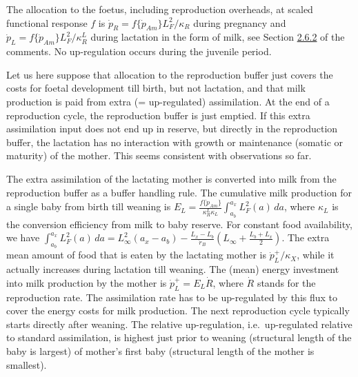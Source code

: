 The allocation to the foetus, including reproduction overheads, at scaled functional response $f$ is $\dot{p}_R = f \{\dot{p}_{Am}\} L_F^2/ \kappa_R$ during pregnancy and $\dot{p}_L = f \{\dot{p}_{Am}\} L_F^2/ \kappa_R^L$ during lactation in the form of milk, see Section \hyperref[ssec_c_c:birth]{2.6.2} of the comments.
No up-regulation occurs during the juvenile period. 

Let us here suppose that allocation to the reproduction buffer just covers the costs for foetal development till birth, but not lactation, and that milk production is paid from extra (= up-regulated) assimilation.
At the end of a reproduction cycle, the reproduction buffer is just emptied.
If this extra assimilation input does not end up in reserve, but directly in the reproduction buffer, the lactation has no interaction with growth or maintenance (somatic or maturity) of the mother.
This seems consistent with observations so far.

The extra assimilation of the lactating mother is converted into milk from the reproduction buffer as a buffer handling rule. 
The cumulative milk production for a single baby from birth till weaning is $E_L = \frac{f \{\dot{p}_{Am}\}} {\kappa_R^L \kappa_L} \int_{a_b}^{a_x} L_F^2(a) \, da$, where $\kappa_L$ is the conversion efficiency from milk to baby reserve.
For constant food availability, we have $\int_{a_b}^{a_x} L_F^2(a) \, da = L_\infty^2 (a_x - a_b) - \frac{L_x - L_b} {\dot{r}_B} \left( L_\infty + \frac{L_b + L_x} {2} \right)$.
The extra mean amount of food that is eaten by the lactating mother is $\dot{p}_L^+/ \kappa_X$, while it actually increases during lactation till weaning.
The (mean) energy investment into milk production by the mother is $\dot{p}_L^+ = E_L \dot{R}$, where $\dot{R}$ stands for the reproduction rate.
The assimilation rate has to be up-regulated by this flux to cover the energy costs for milk production.
The next reproduction cycle typically starts directly after weaning.
The relative up-regulation, i.e.\ up-regulated relative to standard assimilation, is highest just prior to weaning (structural length of the baby is largest) of mother's first baby (structural length of the mother is smallest).

